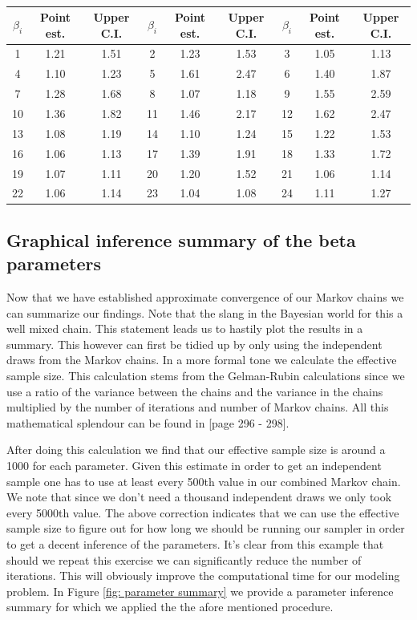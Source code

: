 \documentclass[paper=a4, fontsize=11pt]{scrartcl}
\numberwithin{equation}{section}		%
\numberwithin{figure}{section}			%
\numberwithin{table}{section}				%
\begin{document}
\begin{table}
\begin{center}
\begin{tabular}{c c c | c c c | c c c | }
 \toprule
 $\beta_i$ & Point est. & Upper C.I. &  $\beta_i$ & Point est. & Upper C.I. &   $\beta_i$ & Point est. & Upper C.I.  \\ 
 \midrule
  1 & 1.21 & 1.51 & 2 & 1.23 & 1.53 & 3 & 1.05 & 1.13 \\
  4 & 1.10 & 1.23 & 5 & 1.61 & 2.47 & 6 & 1.40 & 1.87 \\
  7 & 1.28 & 1.68 & 8 & 1.07 & 1.18 & 9 & 1.55 & 2.59 \\
  10 & 1.36 & 1.82 & 11 & 1.46 & 2.17 & 12 & 1.62 & 2.47 \\
  13 & 1.08 & 1.19 & 14 & 1.10 & 1.24 & 15 & 1.22 & 1.53 \\
  16 & 1.06 & 1.13 & 17 & 1.39 & 1.91 & 18 & 1.33 & 1.72 \\
  19 & 1.07 & 1.11 & 20 & 1.20 & 1.52 & 21 & 1.06 & 1.14 \\
  22 & 1.06 & 1.14 & 23 & 1.04 & 1.08 & 24 & 1.11 & 1.27 \\
 \bottomrule
\end{tabular}
\end{center}
\caption{}
\label{Gelman-Rubin convergence table}
\end{table}
\subsection{Graphical inference summary of the beta parameters}
Now that we have established approximate convergence of our Markov chains we can summarize our findings. Note that the slang in the Bayesian world for this a well mixed chain. This statement leads us to hastily plot the results in a summary. This however can first be tidied up by only using the independent draws from the Markov chains. In a more formal tone we calculate the effective sample size. This calculation stems from the Gelman-Rubin calculations since we use a ratio of the variance between the chains and the variance in the chains multiplied by the number of iterations and number of Markov chains. All this mathematical splendour can be found in \cite{GelmanBayesianAnalysis} [page 296 - 298]. 

After doing this calculation we find that our effective sample size is around a 1000 for each parameter. Given this estimate in order to get an independent sample one has to use at least every 500th value in our combined Markov chain. We note that since we don't need a thousand independent draws we only took every 5000th value. The above correction indicates that we can use the effective sample size to figure out for how long we should be running our sampler in order to get a decent inference of the parameters. It's clear from this example that should we repeat this exercise we can significantly reduce the number of iterations. This will obviously improve the computational time for our modeling problem. In Figure \ref{fig: parameter summary} we provide a parameter inference summary for which we applied the the afore mentioned procedure. 
\end{document}
